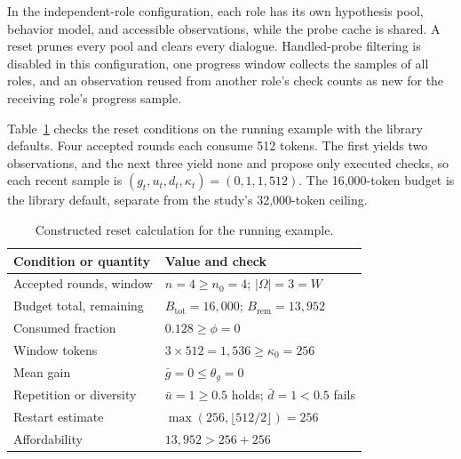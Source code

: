\documentclass[letterpaper,journal]{IEEEtran}
\begin{document}
In the independent-role configuration, each role has its own hypothesis pool, behavior model, and accessible observations, while the probe cache is shared. A reset prunes every pool and clears every dialogue. Handled-probe filtering is disabled in this configuration, one progress window collects the samples of all roles, and an observation reused from another role's check counts as new for the receiving role's progress sample.

Table~\ref{tab:synthetic} checks the reset conditions on the running example with the library defaults. Four accepted rounds each consume 512 tokens. The first yields two observations, and the next three yield none and propose only executed checks, so each recent sample is $(g_t,u_t,d_t,\kappa_t)=(0,1,1,512)$. The 16,000-token budget is the library default, separate from the study's 32,000-token ceiling.

\begin{table}[t]
\caption{Constructed reset calculation for the running example.}\label{tab:synthetic}
\centering\small
\begin{tabular}{@{}p{}p{}@{}}\toprule
Condition or quantity & Value and check\\\midrule
Accepted rounds, window & $n=4\ge n_0=4$; $|\Omega|=3=W$\\
Budget total, remaining & $B_{\mathrm{tot}}=16{,}000$; $B_{\mathrm{rem}}=13{,}952$\\
Consumed fraction & $0.128\ge\phi=0$\\
Window tokens & $3\times512=1{,}536\ge\kappa_0=256$\\
Mean gain & $\bar g=0\le\theta_g=0$\\
Repetition or diversity & $\bar u=1\ge0.5$ holds; $\bar d=1<0.5$ fails\\
Restart estimate & $\max(256,\lfloor512/2\rfloor)=256$\\
Affordability & $13{,}952>256+256$\\
\bottomrule\end{tabular}
\end{table}
\end{document}
